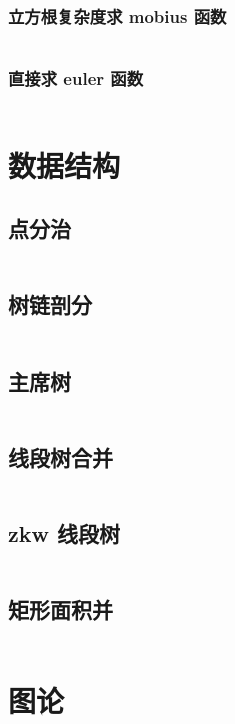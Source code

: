 \documentclass[a4paper, twoside]{article}
\begin{document}
\begin{multicols}{2}
				\subsubsection{立方根复杂度求 mobius 函数}
					\inputminted{cpp}{../src-midori/number/立方根求mu.cpp}
				\subsubsection{直接求 euler 函数}
					\inputminted{cpp}{../src-midori/number/直接求phi.cpp}
		
		\newpage
		\section{数据结构}
			\subsection{点分治}
				\inputminted{cpp}{../src-midori/datastructure/点分治.cpp}
			
			\subsection{树链剖分}
				\inputminted{cpp}{../src-midori/datastructure/树链剖分.cpp}
			
			\subsection{主席树}
				\inputminted{cpp}{../src-midori/datastructure/主席树.cpp}
			
			\subsection{线段树合并}
				\inputminted{cpp}{../src-midori/datastructure/线段树合并.cpp}

			\subsection{zkw 线段树}
				\inputminted{cpp}{../src-midori/datastructure/zkw-segtree.cpp}
			
			\subsection{矩形面积并}
				\inputminted{cpp}{../src-midori/datastructure/矩形面积并.cpp}
				
		\newpage
		\section{图论}


\end{multicols}
\end{document}

